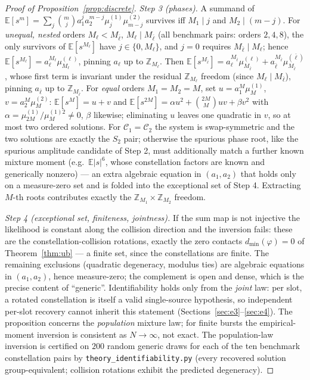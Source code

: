\documentclass[journal]{IEEEtran}
\newcommand{\const}{\mathcal{C}}
\begin{document}
\begin{proof}[Proof of Proposition~\ref{prop:discrete}]
\emph{Step 3 (phases).} A summand of $\mathbb{E}[s^m] = \sum_j
\binom{m}{j} a_1^j a_2^{m-j} \mu_j^{(1)} \mu_{m-j}^{(2)}$ survives iff
$M_1 \mid j$ and $M_2 \mid (m - j)$. For \emph{unequal, nested} orders
$M_\ell < M_{\bar\ell}$, $M_\ell \mid M_{\bar\ell}$ (all benchmark
pairs: orders $2, 4, 8$), the only survivors of $\mathbb{E}[s^{M_\ell}]$
have $j \in \{0, M_\ell\}$, and $j = 0$ requires
$M_{\bar\ell} \mid M_\ell$; hence $\mathbb{E}[s^{M_\ell}] = a_\ell^{M_\ell}
\mu_{M_\ell}^{(\ell)}$, pinning $a_\ell$ up to $\mathbb{Z}_{M_\ell}$.
Then $\mathbb{E}[s^{M_{\bar\ell}}] = a_\ell^{M_{\bar\ell}}
\mu_{M_{\bar\ell}}^{(\ell)} + a_{\bar\ell}^{M_{\bar\ell}}
\mu_{M_{\bar\ell}}^{(\bar\ell)}$, whose first term is invariant under
the residual $\mathbb{Z}_{M_\ell}$ freedom (since
$M_\ell \mid M_{\bar\ell}$), pinning $a_{\bar\ell}$ up to
$\mathbb{Z}_{M_{\bar\ell}}$. For \emph{equal} orders $M_1 = M_2 = M$,
set $u = a_1^M \mu_M^{(1)}$, $v = a_2^M \mu_M^{(2)}$: $\mathbb{E}[s^M] =
u + v$ and $\mathbb{E}[s^{2M}] = \alpha u^2 + \binom{2M}{M} uv + \beta
v^2$ with $\alpha = \mu_{2M}^{(1)} / \mu_M^{(1)2} \neq 0$, $\beta$
likewise; eliminating $u$ leaves one quadratic in $v$, so at most
two ordered solutions. For $\const_1 = \const_2$ the system
is swap-symmetric and the two solutions are exactly the $S_2$ pair;
otherwise the spurious phase root, like the spurious amplitude
candidate of Step 2, must additionally match a further known mixture
moment (e.g.\ $\mathbb{E}|s|^6$, whose constellation factors are
known and generically nonzero) --- an extra algebraic equation in
$(a_1, a_2)$ that holds only on a measure-zero set and is folded into
the exceptional set of Step 4.
Extracting $M$-th roots contributes exactly the $\mathbb{Z}_{M_1}
\times \mathbb{Z}_{M_2}$ freedom.

\emph{Step 4 (exceptional set, finiteness, jointness).} If the sum map
is not injective the likelihood is constant along the collision
direction and the inversion fails: these are the constellation-collision
rotations, exactly the zero contacts $d_{\min}(\varphi) = 0$ of
Theorem~\ref{thm:ub} --- a finite set, since the constellations are
finite. The remaining exclusions (quadratic degeneracy, modulus ties)
are algebraic equations in $(a_1, a_2)$, hence measure-zero; the
complement is open and dense, which is the precise content of
``generic''. Identifiability holds only from the \emph{joint} law: per
slot, a rotated constellation is itself a valid single-source
hypothesis, so independent per-slot recovery cannot inherit this
statement (Sections~\ref{sec:e3}--\ref{sec:e4}). The proposition
concerns the \emph{population} mixture law; for finite bursts the
empirical-moment inversion is consistent as $N \to \infty$, not exact.
The population-law inversion is certified on $200$ random generic draws
for each of the ten benchmark constellation pairs by
\texttt{theory\_identifiability.py} (every recovered solution
group-equivalent; collision rotations exhibit the predicted
degeneracy).
\end{proof}
\end{document}
